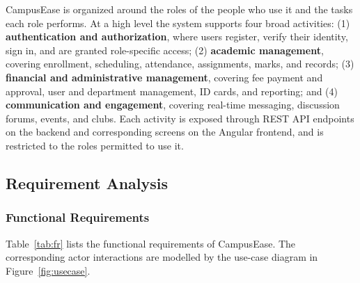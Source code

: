 \documentclass[12pt,a4paper]{report}
\begin{document}
CampusEase is organized around the roles of the people who use it and the tasks each role performs. At a high level the system supports four broad activities: (1) \textbf{authentication and authorization}, where users register, verify their identity, sign in, and are granted role-specific access; (2) \textbf{academic management}, covering enrollment, scheduling, attendance, assignments, marks, and records; (3) \textbf{financial and administrative management}, covering fee payment and approval, user and department management, ID cards, and reporting; and (4) \textbf{communication and engagement}, covering real-time messaging, discussion forums, events, and clubs. Each activity is exposed through REST API endpoints on the backend and corresponding screens on the Angular frontend, and is restricted to the roles permitted to use it.

\subsection{Requirement Analysis}

\subsubsection{Functional Requirements}

Table~\ref{tab:fr} lists the functional requirements of CampusEase. The corresponding actor interactions are modelled by the use-case diagram in Figure~\ref{fig:usecase}.
\end{document}
